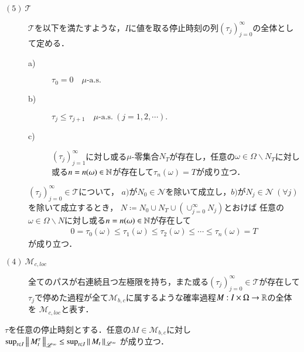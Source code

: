 \begin{description}
		\item[$\mathrm{(5)}\ \mathcal{T}$]
			$\mathcal{T}$を以下を満たすような，$I$に値を取る停止時刻の列$(\tau_j)_{j=0}^{\infty}$の全体として定める．
			\begin{description}
				\item[a)] $\tau_0 = 0 \quad \mbox{$\mu$-a.s.}$
				\item[b)] $\tau_j \leq \tau_{j+1} \quad \mbox{$\mu$-a.s.}\ (j=1,2,\cdots).$
				\item[c)] $(\tau_j)_{j=1}^{\infty}$に対し或る$\mu$-零集合$N_T$が存在し，任意の$\omega \in \Omega \backslash N_T$に対し或る$n = n(\omega) \in \mathbb{N}$が存在して$\tau_n(\omega)=T$が成り立つ．
			\end{description}
			$(\tau_j)_{j=0}^{\infty} \in \mathcal{T}$について，
			$a)$が$N_0 \in \mathcal{N}$を除いて成立し，$b)$が$N_j \in \mathcal{N}\ (\forall j)$を除いて成立するとき，
			$N \coloneqq N_0 \cup N_T \cup (\cup_{j=0}^{\infty}N_j)$とおけば
			任意の$\omega \in \Omega \backslash N$に対し或る$n = n(\omega) \in \mathbb{N}$が存在して
			\begin{align}
				0 = \tau_0(\omega) \leq \tau_1(\omega) \leq \tau_2(\omega) \leq \cdots
				\leq \tau_n(\omega) = T
			\end{align}
			が成り立つ．
			
		\item[$\mathrm{(4)}\ \mathcal{M}_{c,loc}$]
			全てのパスが右連続且つ左極限を持ち，また或る$(\tau_j)_{j=0}^{\infty} \in \mathcal{T}$が存在して
			$\tau_j$で停めた過程が全て$\mathcal{M}_{b,c}$に属するような確率過程$M:I \times \Omega \rightarrow \mathbb{R}$の全体を
			$\mathcal{M}_{c,loc}$と表す．
	\end{description}
	
	\begin{screen}
		\begin{thm}[有界なマルチンゲールを停止時刻で停めた過程の有界性]
			$\tau$を任意の停止時刻とする．任意の$M \in \mathcal{M}_{b,c}$に対し
			$\operatorname*{sup}_{t \in I} \left\|\, M_t^\tau\, \right\|_{\mathscr{L}^\infty} \leq \operatorname*{sup}_{t \in I} \left\|\, M_t\, \right\|_{\mathscr{L}^\infty}$
			が成り立つ．
			\label{thm:boundedness_of_stopped_process_of_bounded_martingale}
		\end{thm}
	\end{screen}
	
